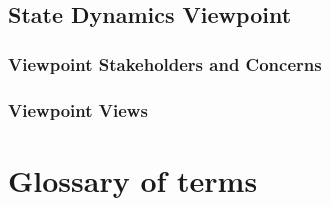 \documentclass[onecolumn, draftclsnofoot,10pt, compsoc]{IEEEtran}
\newcounter{subsubsubsection}[subsubsection]
\begin{document}
        
        \subsection{State Dynamics Viewpoint}
        \subsubsection{Viewpoint Stakeholders and Concerns}
        \subsubsection{Viewpoint Views}
          
        \section{Glossary of terms}
        
        \pagebreak
        \nocite{*} %
        
            
        
    
\end{document}

